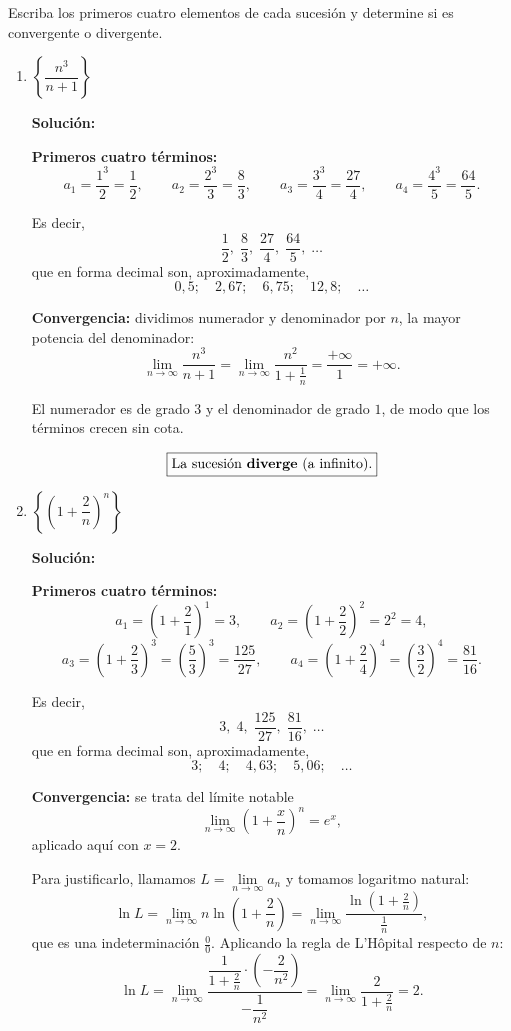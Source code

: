 \documentclass[12pt]{article}
\newcommand{\solucion}{%
    \vspace{0.8em}%
    \textbf{Solución:}%
}
\begin{document}
Escriba los primeros cuatro elementos de cada sucesión y determine si es
convergente o divergente.

\begin{enumerate}[label=\alph*.-]

    \item $\left\{\dfrac{n^3}{n+1}\right\}$

    \solucion

    \textbf{Primeros cuatro términos:}
    \[
    a_1=\frac{1^3}{2}=\frac12,
    \qquad
    a_2=\frac{2^3}{3}=\frac83,
    \qquad
    a_3=\frac{3^3}{4}=\frac{27}{4},
    \qquad
    a_4=\frac{4^3}{5}=\frac{64}{5}.
    \]

    Es decir,
    \[
    \frac12,\;\frac83,\;\frac{27}{4},\;\frac{64}{5},\;\dots
    \]
    que en forma decimal son, aproximadamente,
    \[
    0{,}5;\quad 2{,}67;\quad 6{,}75;\quad 12{,}8;\quad\dots
    \]

    \textbf{Convergencia:} dividimos numerador y denominador por $n$, la mayor
    potencia del denominador:
    \[
    \lim_{n\to\infty}\frac{n^3}{n+1}
    =\lim_{n\to\infty}\frac{n^2}{1+\frac1n}
    =\frac{+\infty}{1}=+\infty .
    \]

    El numerador es de grado $3$ y el denominador de grado $1$, de modo que los
    términos crecen sin cota.

    \[
    \boxed{
    \text{La sucesión \textbf{diverge} (a infinito).}
    }
    \]

    \setcounter{enumi}{2} %

    \item $\left\{\left(1+\dfrac{2}{n}\right)^{n}\right\}$

    \solucion

    \textbf{Primeros cuatro términos:}
    \[
    a_1=\left(1+\frac21\right)^{1}=3,
    \qquad
    a_2=\left(1+\frac22\right)^{2}=2^2=4,
    \]
    \[
    a_3=\left(1+\frac23\right)^{3}=\left(\frac53\right)^{3}=\frac{125}{27},
    \qquad
    a_4=\left(1+\frac24\right)^{4}=\left(\frac32\right)^{4}=\frac{81}{16}.
    \]

    Es decir,
    \[
    3,\;4,\;\frac{125}{27},\;\frac{81}{16},\;\dots
    \]
    que en forma decimal son, aproximadamente,
    \[
    3;\quad 4;\quad 4{,}63;\quad 5{,}06;\quad\dots
    \]

    \textbf{Convergencia:} se trata del límite notable
    \[
    \lim_{n\to\infty}\left(1+\frac{x}{n}\right)^{n}=e^{x},
    \]
    aplicado aquí con $x=2$.

    Para justificarlo, llamamos $L=\lim\limits_{n\to\infty}a_n$ y tomamos
    logaritmo natural:
    \[
    \ln L
    =\lim_{n\to\infty}n\ln\left(1+\frac2n\right)
    =\lim_{n\to\infty}\frac{\ln\left(1+\frac2n\right)}{\frac1n},
    \]
    que es una indeterminación $\frac00$. Aplicando la regla de L'Hôpital
    respecto de $n$:
    \[
    \ln L
    =\lim_{n\to\infty}
    \frac{\dfrac{1}{1+\frac2n}\cdot\left(-\dfrac{2}{n^2}\right)}
         {-\dfrac{1}{n^2}}
    =\lim_{n\to\infty}\frac{2}{1+\frac2n}
    =2 .
    \]


\end{enumerate}
\end{document}
